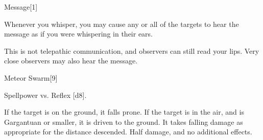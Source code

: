 \begin{spellsection}{Message}[1]
    \begin{spellheader}
    \end{spellheader}
    \begin{spellcontent}
        \begin{spelltargetinginfo}
        \end{spelltargetinginfo}
        \begin{spelleffects}
            \spelleffect Whenever you whisper, you may cause any or all of the targets to hear the message as if you were whispering in their ears.
            \spelldur \durlong
        \end{spelleffects}
    \end{spellcontent}
    \begin{spellfooter}
        \spellnotes This is not telepathic communication, and observers can still read your lips. Very close observers may also hear the message.
        \miscastexplode
    \end{spellfooter}
\end{spellsection}

\begin{spellsection}{Meteor Swarm}[9]
    \begin{spellheader}
    \end{spellheader}
    \begin{spellcontent}
        \begin{spelltargetinginfo}
            \spellrng{\rngmed}
        \end{spelltargetinginfo}
        \begin{spelleffects}
            \begin{spellattack}{Spellpower vs. Reflex}
                \spellsuccess {}[d8].

                If the target is on the ground, it falls prone. If the target is in the air, and is Gargantuan or smaller, it is driven to the ground. It takes falling damage as appropriate for the distance descended.
                \spellfailure Half damage, and no additional effects.
            \end{spellattack}
        \end{spelleffects}
    \end{spellcontent}
    \begin{spellfooter}
        \spellnotes \firespellnotes

        \destructivespellnotes
        \miscastyou
    \end{spellfooter}
\end{spellsection}

